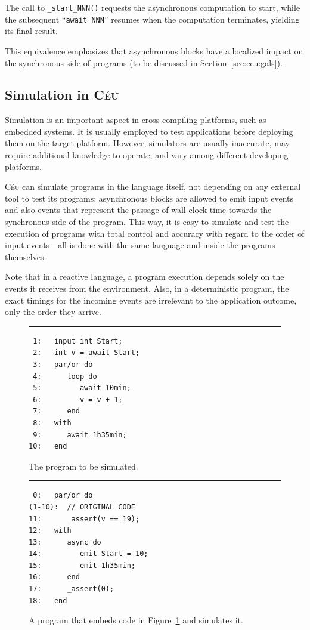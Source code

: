 \documentclass{sigplan-proc}
\newcommand{\2}{\;\;}
\newcommand{\5}{\;\;\;\;\;}
\newcommand{\CEU}{\textsc{C\'{e}u}}
\newcommand{\code}[1] {{\small{\texttt{#1}}}}
\begin{document}
The call to \code{\_start\_NNN()} requests the asynchronous computation to 
start, while the subsequent ``\code{await NNN}'' resumes when the computation 
terminates, yielding its final result.

This equivalence emphasizes that asynchronous blocks have a localized impact on 
the synchronous side of programs (to be discussed in 
Section~\ref{sec:ceu:gals}).

\subsection{Simulation in \CEU}
\label{sec:ceu:simul}

Simulation is an important aspect in cross-compiling platforms, such as 
embedded systems.
It is usually employed to test applications before deploying them on the target 
platform.
However, simulators are usually inaccurate, may require additional knowledge to 
operate, and vary among different developing platforms.

\CEU{} can simulate programs in the language itself, not depending on any 
external tool to test its programs: asynchronous blocks are allowed to emit 
input events and also events that represent the passage of wall-clock time 
towards the synchronous side of the program.
This way, it is easy to simulate and test the execution of programs with total 
control and accuracy with regard to the order of input events---all is done 
with the same language and inside the programs themselves.

Note that in a reactive language, a program execution depends solely on the 
events it receives from the environment.
Also, in a deterministic program, the exact timings for the incoming events are 
irrelevant to the application outcome, only the order they arrive.

\begin{figure}[t]
\rule{8.5cm}{0.37pt}
{\small
\begin{verbatim}
 1:   input int Start;
 2:   int v = await Start;
 3:   par/or do
 4:      loop do
 5:         await 10min;
 6:         v = v + 1;
 7:      end
 8:   with
 9:      await 1h35min;
10:   end
\end{verbatim}
}
\caption{ The program to be simulated.
\label{lst:ceu:simul:1}
}
\end{figure}

\begin{figure}[t]
\rule{8.5cm}{0.37pt}
{\small
\begin{verbatim}
 0:   par/or do
(1-10):  // ORIGINAL CODE
11:      _assert(v == 19);
12:   with
13:      async do
14:         emit Start = 10;
15:         emit 1h35min;
16:      end
17:      _assert(0);
18:   end
\end{verbatim}
}
\caption{ A program that embeds code in Figure~\ref{lst:ceu:simul:1} and 
simulates it.
\label{lst:ceu:simul:2}
}
\end{figure}
\end{document}
